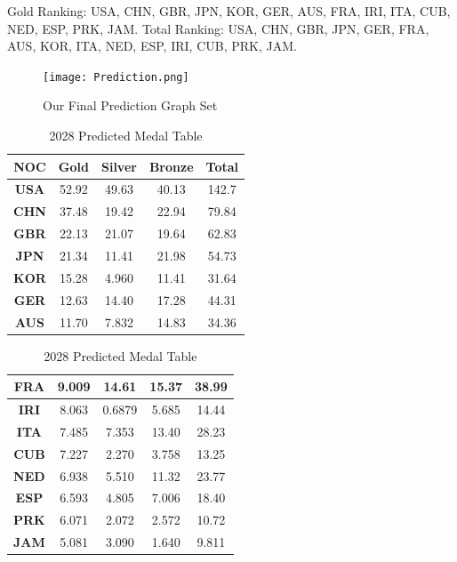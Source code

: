\documentclass{mcmthesis}
\begin{document}
Gold Ranking: USA, CHN, GBR, JPN, KOR, GER, AUS, FRA, IRI, ITA, CUB, NED, ESP, PRK, JAM. Total Ranking: USA, CHN, GBR, JPN, GER, FRA, AUS, KOR, ITA, NED, ESP, IRI, CUB, PRK, JAM.

\begin{figure}[h!]
    \centering
    \texttt{[image: Prediction.png]}
    \caption{Our Final Prediction Graph Set}
    \label{fig:Prediction}
\end{figure}

\begin{table}[htbp]
\centering
\caption{2028 Predicted Medal Table}
\small
\begin{subtable}{0.48\textwidth}
\centering
\begin{tabular}{|c|c|c|c|c|}
\hline
\textbf{NOC} & \textbf{Gold} & \textbf{Silver} & \textbf{Bronze} & \textbf{Total} \\ \hline
\textbf{USA} & 52.92 & 49.63 & 40.13 & 142.7 \\ \hline
\textbf{CHN} & 37.48 & 19.42 & 22.94 & 79.84 \\ \hline
\textbf{GBR} & 22.13 & 21.07 & 19.64 & 62.83 \\ \hline
\textbf{JPN} & 21.34 & 11.41 & 21.98 & 54.73 \\ \hline
\textbf{KOR} & 15.28 & 4.960 & 11.41 & 31.64 \\ \hline
\textbf{GER} & 12.63 & 14.40 & 17.28 & 44.31 \\ \hline
\textbf{AUS} & 11.70 & 7.832 & 14.83 & 34.36 \\ \hline
\end{tabular}
\end{subtable}
\hfill
\begin{subtable}{0.48\textwidth}
\centering
\begin{tabular}{|c|c|c|c|c|}
\hline
\textbf{FRA} & 9.009 & 14.61 & 15.37 & 38.99 \\ \hline
\textbf{IRI} & 8.063 & 0.6879 & 5.685 & 14.44 \\ \hline
\textbf{ITA} & 7.485 & 7.353 & 13.40 & 28.23 \\ \hline
\textbf{CUB} & 7.227 & 2.270 & 3.758 & 13.25 \\ \hline
\textbf{NED} & 6.938 & 5.510 & 11.32 & 23.77 \\ \hline
\textbf{ESP} & 6.593 & 4.805 & 7.006 & 18.40 \\ \hline
\textbf{PRK} & 6.071 & 2.072 & 2.572 & 10.72 \\ \hline
\textbf{JAM} & 5.081 & 3.090 & 1.640 & 9.811 \\ \hline
\end{tabular}
\end{subtable}
\end{table}
\end{document}

